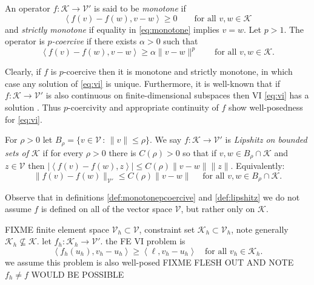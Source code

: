 \documentclass[hidelinks,onefignum,onetabnum,final]{siamart220329}  %
\newcommand{\cK}{\mathcal{K}}
\newcommand{\cV}{\mathcal{V}}
\newcommand{\ip}[2]{\left<#1,#2\right>}
\begin{document}
\begin{definition} \label{def:monotonepcoercive}
An operator $f:\cK \to \cV'$ is said to be \emph{monotone} if
\begin{equation}
\ip{f(v)-f(w)}{v-w} \ge 0 \qquad \text{for all } v,w \in \cK \label{eq:monotone}
\end{equation}
and \emph{strictly monotone} if equality in \eqref{eq:monotone} implies $v=w$.  Let $p>1$.  The operator is \emph{$p$-coercive} \cite{Bueler2021conservation} if there exists $\alpha>0$ such that
\begin{equation}
\ip{f(v)-f(w)}{v-w} \ge \alpha \|v-w\|^p \qquad \text{for all } v,w \in \cK. \label{eq:pcoercive}
\end{equation}
\end{definition}

Clearly, if $f$ is $p$-coercive then it is monotone and strictly monotone, in which case any solution of \eqref{eq:vi} is unique.  Furthermore, it is well-known that if $f:\cK \to \cV'$ is also continuous on finite-dimensional subspaces then VI \eqref{eq:vi} has a solution \cite[Corollary III.1.8]{KinderlehrerStampacchia1980}.  Thus $p$-coercivity and appropriate continuity of $f$ show well-posedness for \eqref{eq:vi}.


\begin{definition} \label{def:lipshitz}
For $\rho>0$ let $B_\rho = \{v\in \cV\,:\,\|v\|\le \rho\}$.  We say $f:\cK \to \cV'$ is \emph{Lipshitz on bounded sets of $\cK$} if for every $\rho>0$ there is $C(\rho)>0$ so that if $v,w \in B_\rho \cap \cK$ and $z\in\cV$ then $|\ip{f(v)-f(w)}{z}| \le C(\rho) \|v-w\| \|z\|$.  Equivalently:
\begin{equation}
\|f(v)-f(w)\|_{\cV'} \le C(\rho) \|v-w\| \quad \text{ for all } v,w \in B_\rho \cap \cK.  \label{eq:liponbounded}
\end{equation}
\end{definition}

Observe that in definitions \ref{def:monotonepcoercive} and \ref{def:lipshitz} we do not assume $f$ is defined on all of the vector space $\cV$, but rather only on $\cK$.

FIXME finite element space $\cV_h \subset \cV$, constraint set $\cK_h\subset \cV_h$, note generally $\cK_h \nsubseteq \cK$.  let $f_h:\cK_h\to\cV'$.  the FE VI problem is
\begin{equation}
\ip{f_h(u_h)}{v_h-u_h} \ge \ip{\ell}{v_h-u_h} \quad \text{for all } v_h\in \cK_h. \label{eq:fe:vi}
\end{equation}
we assume this problem is also well-posed FIXME FLESH OUT AND NOTE $f_h\ne f$ WOULD BE POSSIBLE
\end{document}

